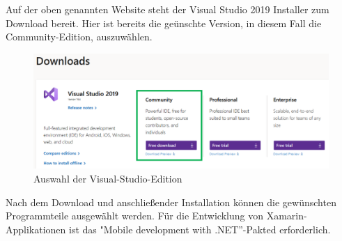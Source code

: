 




Auf der oben genannten Website steht der Visual Studio 2019 Installer zum Download bereit.
Hier ist bereits die geünschte Version, in diesem Fall die Community-Edition, auszuwählen.
\begin{figure}[H]
    \centering\includegraphics[width=0.9\linewidth]{images/auswahl_rahmenwerk/download.png}    
    \caption{Auswahl der Visual-Studio-Edition}
\end{figure}
Nach dem Download und anschließender Installation können die gewünschten Programmteile ausgewählt werden.
Für die Entwicklung von Xamarin-Applikationen ist das "Mobile development with .NET''-Pakted erforderlich.


